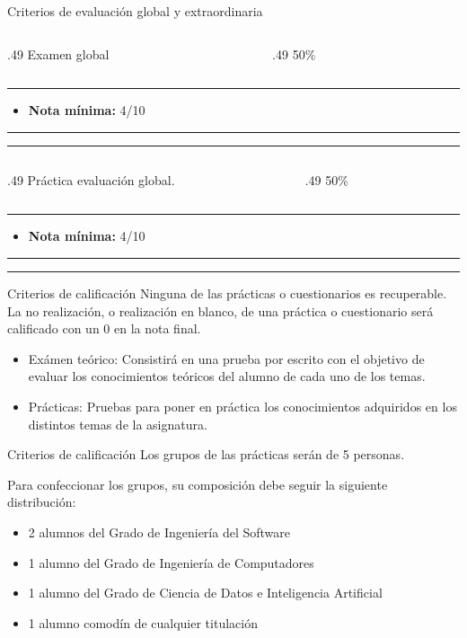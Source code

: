 \begin{frame}{Criterios de evaluación global y extraordinaria}
\begin{columns}[T]
\begin{column}{.49\textwidth}
Examen global
\end{column}
\hfill
\begin{column}{.49\textwidth}
\centering
\alert{\Huge 50\%}
\end{column}
\end{columns}
\vfill
\hrule

\begin{itemize}
    \item \textbf{Nota mínima:} 4/10
\end{itemize}
\vfill
\hrule
\hrule

\vfill
\begin{columns}[T]
\begin{column}{.49\textwidth}
Práctica evaluación global.
\end{column}
\hfill
\begin{column}{.49\textwidth}
\centering
\alert{\Huge 50\%}
\end{column}
\end{columns}
\vfill
\hrule

\begin{itemize}
    \item \textbf{Nota mínima:} 4/10
\end{itemize}
\vfill
\hrule
\hrule
\vfill

\end{frame}

\begin{frame}{Criterios de calificación}
Ninguna de las prácticas o cuestionarios es recuperable. \alert{La no realización, o realización en blanco, de una práctica o cuestionario será calificado con un 0 en la nota final}.
\begin{itemize}
    \item \alert{Exámen teórico}: Consistirá en una prueba por escrito con el objetivo de evaluar los conocimientos teóricos del alumno de cada uno de los temas.
    \item \alert{Prácticas}: Pruebas para poner en práctica los conocimientos adquiridos en los distintos temas de la asignatura.
\end{itemize}
\end{frame}

\begin{frame}{Criterios de calificación}
Los grupos de las \alert{prácticas} serán de \alert{5 personas}.

Para confeccionar los grupos, su composición debe seguir la siguiente distribución:
\begin{itemize}
    \item 2 alumnos del Grado de Ingeniería del Software
    \item 1 alumno del Grado de Ingeniería de Computadores
    \item 1 alumno del Grado de Ciencia de Datos e Inteligencia Artificial
    \item 1 alumno comodín de cualquier titulación
\end{itemize}
\end{frame}

